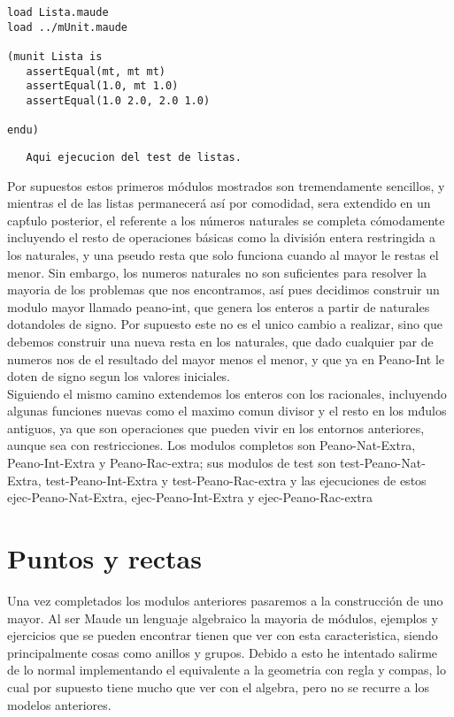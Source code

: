 \documentclass[12pt,a4paper]{book}
\begin{document}
\begin{verbatim}
load Lista.maude
load ../mUnit.maude

(munit Lista is
   assertEqual(mt, mt mt)
   assertEqual(1.0, mt 1.0)
   assertEqual(1.0 2.0, 2.0 1.0)

endu)

\end{verbatim}

\begin{verbatim}
   Aqui ejecucion del test de listas.
\end{verbatim}

Por supuestos estos primeros m\'odulos mostrados son tremendamente sencillos, y mientras el de las listas permanecer\'a as\'i por comodidad, sera extendido en un cap\'tulo posterior, el referente a los n\'umeros naturales se completa c\'omodamente incluyendo el resto de operaciones b\'asicas como la divisi\'on entera restringida a los naturales, y una pseudo resta que solo funciona cuando al mayor le restas el menor. Sin embargo, los numeros naturales no son suficientes para resolver la mayoria de los problemas que nos encontramos, as\'i pues decidimos construir un modulo mayor llamado peano-int, que genera los enteros a partir de naturales dotandoles de signo. Por supuesto este no es el unico cambio a realizar, sino que debemos construir una nueva resta en los naturales, que dado cualquier par de numeros nos de el resultado del mayor menos el menor, y que ya en Peano-Int le doten de signo segun los valores iniciales. \\

Siguiendo el mismo camino extendemos los enteros con los racionales, incluyendo algunas funciones nuevas como el maximo comun divisor y el resto en los m\'dulos antiguos, ya que son operaciones que pueden vivir en los entornos anteriores, aunque sea con restricciones. Los modulos completos son Peano-Nat-Extra, Peano-Int-Extra y Peano-Rac-extra; sus modulos de test son test-Peano-Nat-Extra, test-Peano-Int-Extra y test-Peano-Rac-extra y las ejecuciones de estos ejec-Peano-Nat-Extra, ejec-Peano-Int-Extra y ejec-Peano-Rac-extra \par

\chapter{Puntos y rectas}\label{cap.2}

Una vez completados los modulos anteriores pasaremos a la construcci\'on de uno mayor. Al ser Maude un lenguaje algebraico la mayoria de m\'odulos, ejemplos y ejercicios que se pueden encontrar tienen que ver con esta caracteristica, siendo principalmente cosas como anillos y grupos. Debido a esto he intentado salirme de lo normal implementando el equivalente a la geometria con regla y compas, lo cual por supuesto tiene mucho que ver con el algebra, pero no se recurre a los modelos anteriores. \\
\end{document}
